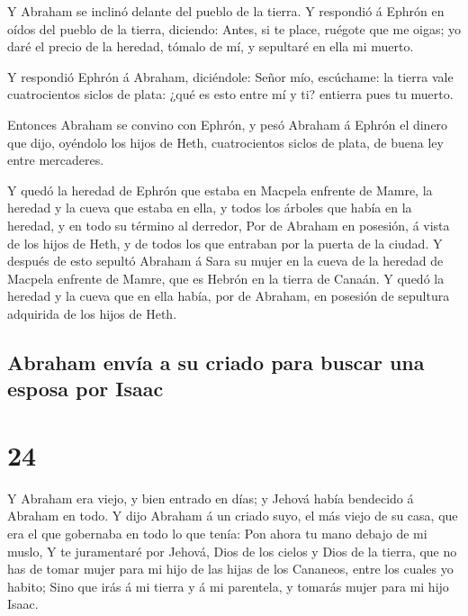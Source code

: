  Y Abraham se inclinó delante del pueblo de la tierra.
 Y respondió á Ephrón en oídos del pueblo de la tierra,
diciendo: Antes, si te place, ruégote que me oigas; yo daré el precio de
la heredad, tómalo de mí, y sepultaré en ella mi muerto.

 Y respondió Ephrón á Abraham, diciéndole:
 Señor mío, escúchame: la tierra vale cuatrocientos
siclos de plata: ¿qué es esto entre mí y ti? entierra pues tu muerto.

 Entonces Abraham se convino con Ephrón, y pesó Abraham á
Ephrón el dinero que dijo, oyéndolo los hijos de Heth, cuatrocientos
siclos de plata, de buena ley entre mercaderes.

 Y quedó la heredad de Ephrón que estaba en Macpela
enfrente de Mamre, la heredad y la cueva que estaba en ella, y todos los
árboles que había en la heredad, y en todo su término al derredor,
 Por de Abraham en posesión, á vista de los hijos de
Heth, y de todos los que entraban por la puerta de la ciudad.
 Y después de esto sepultó Abraham á Sara su mujer en la
cueva de la heredad de Macpela enfrente de Mamre, que es Hebrón en la
tierra de Canaán.  Y quedó la heredad y la cueva que en
ella había, por de Abraham, en posesión de sepultura adquirida de los
hijos de Heth.

\hypertarget{abraham-envuxeda-a-su-criado-para-buscar-una-esposa-por-isaac}{%
\subsection{Abraham envía a su criado para buscar una esposa por
Isaac}\label{abraham-envuxeda-a-su-criado-para-buscar-una-esposa-por-isaac}}

\hypertarget{section-23}{%
\section{24}\label{section-23}}

 Y Abraham era viejo, y bien entrado en días; y Jehová
había bendecido á Abraham en todo.  Y dijo Abraham á un
criado suyo, el más viejo de su casa, que era el que gobernaba en todo
lo que tenía: Pon ahora tu mano debajo de mi muslo,  Y te
juramentaré por Jehová, Dios de los cielos y Dios de la tierra, que no
has de tomar mujer para mi hijo de las hijas de los Cananeos, entre los
cuales yo habito;  Sino que irás á mi tierra y á mi
parentela, y tomarás mujer para mi hijo Isaac.

